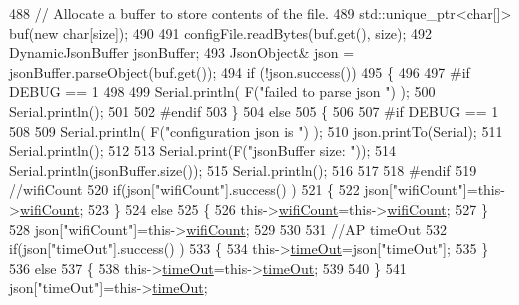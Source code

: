 \begin{DoxyCode}
488         \textcolor{comment}{// Allocate a buffer to store contents of the file.}
489         std::unique\_ptr<char[]> buf(\textcolor{keyword}{new} \textcolor{keywordtype}{char}[size]);
490 
491         configFile.readBytes(buf.get(), size);
492         DynamicJsonBuffer jsonBuffer;
493         JsonObject& json = jsonBuffer.parseObject(buf.get());
494         \textcolor{keywordflow}{if} (!json.success()) 
495         \{
496         
497 \textcolor{preprocessor}{        #if DEBUG == 1 }
498 
499             Serial.println( F(\textcolor{stringliteral}{"failed to parse json "}) );
500             Serial.println();
501         
502 \textcolor{preprocessor}{        #endif}
503         \} 
504         \textcolor{keywordflow}{else}
505         \{
506         
507 \textcolor{preprocessor}{        #if DEBUG == 1 }
508         
509             Serial.println( F(\textcolor{stringliteral}{"configuration json is "}) );
510             json.printTo(Serial);
511             Serial.println();
512 
513             Serial.print(F(\textcolor{stringliteral}{"jsonBuffer size: "}));
514             Serial.println(jsonBuffer.size());
515             Serial.println();
516 
517 
518 \textcolor{preprocessor}{        #endif}
519             \textcolor{comment}{//wifiCount}
520             \textcolor{keywordflow}{if}(json[\textcolor{stringliteral}{"wifiCount"}].success() )
521             \{           
522                 json[\textcolor{stringliteral}{"wifiCount"}]=this->\hyperlink{classCoolWifi_ab133bd92fcb895b884deecd6678592e4}{wifiCount};
523             \}
524             \textcolor{keywordflow}{else}
525             \{
526                 this->\hyperlink{classCoolWifi_ab133bd92fcb895b884deecd6678592e4}{wifiCount}=this->\hyperlink{classCoolWifi_ab133bd92fcb895b884deecd6678592e4}{wifiCount};
527             \}
528             json[\textcolor{stringliteral}{"wifiCount"}]=this->\hyperlink{classCoolWifi_ab133bd92fcb895b884deecd6678592e4}{wifiCount};
529 
530             
531             \textcolor{comment}{//AP timeOut}
532             \textcolor{keywordflow}{if}(json[\textcolor{stringliteral}{"timeOut"}].success() )
533             \{
534                 this->\hyperlink{classCoolWifi_a952111605f25156588b5632caaba1c6f}{timeOut}=json[\textcolor{stringliteral}{"timeOut"}];
535             \}
536             \textcolor{keywordflow}{else}
537             \{
538                 this->\hyperlink{classCoolWifi_a952111605f25156588b5632caaba1c6f}{timeOut}=this->\hyperlink{classCoolWifi_a952111605f25156588b5632caaba1c6f}{timeOut};
539 
540             \}
541             json[\textcolor{stringliteral}{"timeOut"}]=this->\hyperlink{classCoolWifi_a952111605f25156588b5632caaba1c6f}{timeOut};

\end{DoxyCode}
